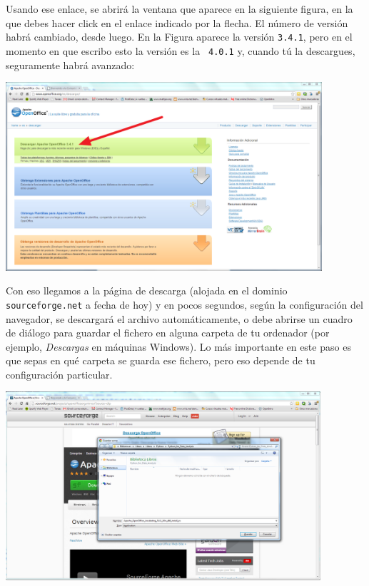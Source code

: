 \documentclass[10pt,a4paper]{article}\usepackage[]{graphicx}\usepackage[]{color}
\begin{document}
Usando ese enlace, se abrirá la ventana que aparece en la siguiente figura, en la que debes hacer
click en el enlace indicado por la flecha. El número de versión habrá cambiado, desde luego. En la
Figura aparece la versión {\tt 3.4.1}, pero en el momento en que escribo esto la versión es la {\tt
4.0.1} y, cuando tú la descargues, seguramente habrá avanzado:
    \begin{center}
    \includegraphics[height=7cm]{../fig/Tut00-WebOpenOffice-01.png}
    \end{center}

Con eso llegamos a la página de descarga (alojada en el dominio {\tt sourceforge.net} a fecha de
hoy) y en pocos segundos, según la configuración del navegador, se descargará el archivo
automáticamente, o debe abrirse un cuadro de diálogo para guardar el fichero en alguna carpeta de
tu ordenador (por ejemplo, {\em Descargas} en máquinas Windows). Lo más importante en este paso es
que sepas en qué carpeta se guarda ese fichero, pero eso depende de tu configuración particular.

    \begin{center}
    \includegraphics[height=7cm]{../fig/Tut00-WebOpenOffice-02.png}
    \end{center}
\end{document}
